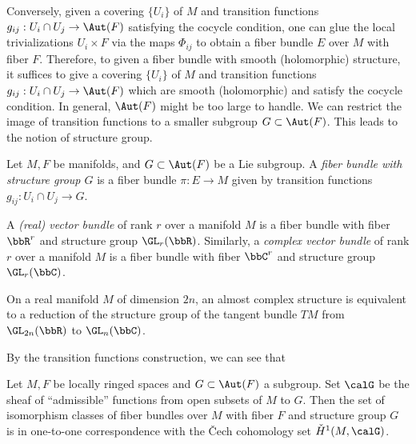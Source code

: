     Conversely, given a covering \(\{U_i\}\) of \(M\) and transition functions \(g_{ij}: U_i \cap U_j \to \Aut(F)\) satisfying the cocycle condition,
    one can glue the local trivializations \(U_i \times F\) via the maps \(\Phi_{ij}\) to obtain a fiber bundle \(E\) over \(M\) with fiber \(F\).
    Therefore, to given a fiber bundle with smooth (holomorphic) structure, it suffices to give a covering \(\{U_i\}\) of \(M\) and transition functions \(g_{ij}: U_i \cap U_j \to \Aut(F)\) which are smooth (holomorphic) and satisfy the cocycle condition.
    In general, \(\Aut(F)\) might be too large to handle.
    We can restrict the image of transition functions to a smaller subgroup \(G \subset \Aut(F)\).
    This leads to the notion of structure group.

    \begin{definition}\label{def:structure_group_of_vector_bundles}
        Let \(M,F\) be manifolds, and \(G \subset \Aut(F)\) be a Lie subgroup.
        A \emph{fiber bundle with structure group \(G\)} is a fiber bundle \(\pi: E \to M\) given by transition functions \(g_{ij}: U_i \cap U_j \to G\).
    \end{definition}

    \begin{example}\label{eg:vector_bundle_as_fiber_bundle}
        A \emph{(real) vector bundle} of rank \(r\) over a manifold \(M\) is a fiber bundle with fiber \(\bbR^r\) and structure group \(\GL_r(\bbR)\).
        Similarly, a \emph{complex vector bundle} of rank \(r\) over a manifold \(M\) is a fiber bundle with fiber \(\bbC^r\) and structure group \(\GL_r(\bbC)\).

        On a real manifold \(M\) of dimension \(2n\), an almost complex structure is equivalent to a reduction of the structure group of the tangent bundle \(TM\) from \(\GL_{2n}(\bbR)\) to \(\GL_n(\bbC)\).
    \end{example}

    By the transition functions construction, we can see that
    \begin{theorem}\label{thm:classification_fiber_bundle_by_sheaves_cohomology}
        Let \(M,F\) be locally ringed spaces and \(G \subset \Aut(F)\) a subgroup.
        Set \(\calG\) be the sheaf of ``admissible'' functions from open subsets of \(M\) to \(G\).
        Then the set of isomorphism classes of fiber bundles over \(M\) with fiber \(F\) and structure group \(G\) is in one-to-one correspondence with the \v{C}ech cohomology set \(\check{H}^1(M,\calG)\).
    \end{theorem}

